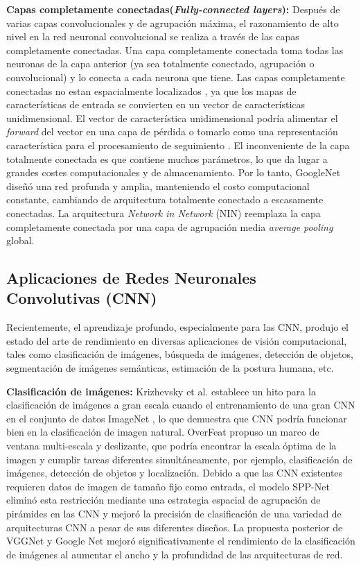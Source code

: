 \textbf{Capas completamente conectadas(\textit{Fully-connected layers}):}  Después de varias capas convolucionales y de agrupación máxima, el razonamiento de alto nivel en la red neuronal convolucional se realiza a través de las capas completamente conectadas. Una capa completamente conectada toma todas las neuronas de la capa anterior (ya sea totalmente conectado, agrupación o convolucional) y lo conecta a cada neurona que tiene. Las capas completamente conectadas no estan espacialmente localizados , ya que los mapas de características de entrada se convierten en un vector de características unidimensional. El vector de característica unidimensional podría alimentar el \textit{forward} del vector en una capa de pérdida o tomarlo como una representación característica para el procesamiento de seguimiento \cite{Girshick}. El inconveniente de la capa totalmente conectada es que contiene muchos parámetros, lo que da lugar a grandes costes computacionales y de almacenamiento. Por lo tanto, GoogleNet \cite{Szegedy} diseñó una red profunda y amplia, manteniendo el costo computacional constante, cambiando de arquitectura totalmente conectado a escasamente conectadas. La arquitectura \textit{Network in Network} (NIN) \cite{Lin} reemplaza la capa completamente conectada por una capa de agrupación media \textit{average pooling} global.


\subsection {Aplicaciones de   {Redes Neuronales Convolutivas (CNN)}}

Recientemente, el aprendizaje profundo, especialmente para las CNN, produjo el estado del arte de rendimiento en diversas aplicaciones de visión computacional, tales como clasificación de imágenes, búsqueda de imágenes, detección de objetos, segmentación de imágenes semánticas, estimación de la postura humana, etc.

\textbf{Clasificación de imágenes:} Krizhevsky et al. \cite{Krizhevsky} establece un hito para la clasificación de imágenes a gran escala cuando el entrenamiento de una gran CNN en el conjunto de datos ImageNet \cite{Deng}, lo que demuestra que CNN podría funcionar bien en la clasificación de imagen natural. OverFeat \cite{Sermanet} propuso un marco de ventana multi-escala y deslizante, que podría encontrar la escala óptima de la imagen y cumplir tareas diferentes simultáneamente, por ejemplo, clasificación de imágenes, detección de objetos y localización. Debido a que las CNN existentes requieren datos de imagen de tamaño fijo como entrada, el modelo SPP-Net eliminó esta restricción mediante una estrategia espacial de agrupación de pirámides en las CNN y mejoró la precisión de clasificación de una variedad de arquitecturas CNN a pesar de sus diferentes diseños.  La propuesta posterior de VGGNet \cite{Simonyan} y Google Net \cite{Szegedy} mejoró significativamente el rendimiento de la clasificación de imágenes al aumentar el ancho y la profundidad de las arquitecturas de red.

